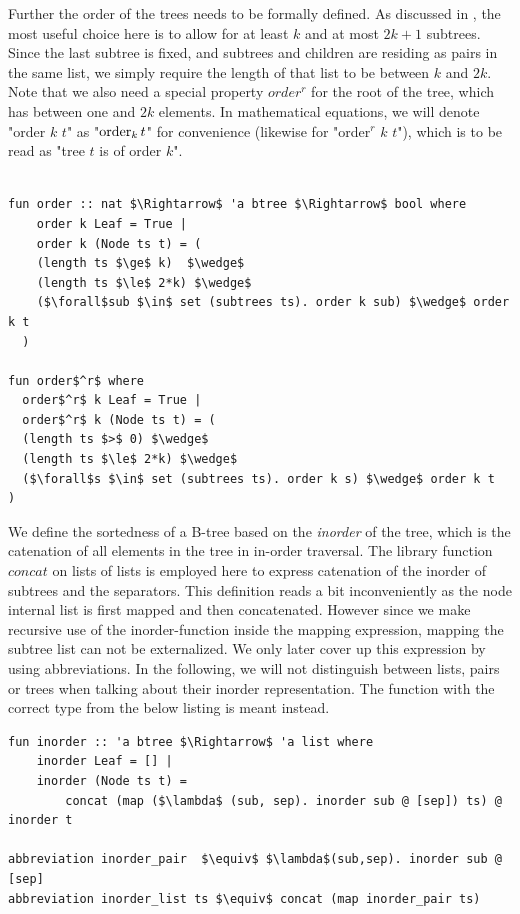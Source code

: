 Further the order of the trees needs to be formally defined.
As discussed in , the most useful choice here is
to allow for at least $k$ and at most $2k+1$ subtrees.
Since the last subtree is fixed, and subtrees and children are residing as pairs in the same list,
we simply require the length of that list to be between $k$ and $2k$.
Note that we also need a special property $order^r$ for the root of the tree,
which has between one and $2k$ elements.
In mathematical equations, we will denote "order $k$ $t$" as "$\operatorname{order}_k t$"
for convenience (likewise for "order$^r$ $k$ $t$"), which is to be read as
"tree $t$ is of order $k$".

\begin{lstlisting}[mathescape=true, language=Isabelle]

fun order :: nat $\Rightarrow$ 'a btree $\Rightarrow$ bool where
    order k Leaf = True |
    order k (Node ts t) = (
    (length ts $\ge$ k)  $\wedge$
    (length ts $\le$ 2*k) $\wedge$
    ($\forall$sub $\in$ set (subtrees ts). order k sub) $\wedge$ order k t
  )

fun order$^r$ where
  order$^r$ k Leaf = True |
  order$^r$ k (Node ts t) = (
  (length ts $>$ 0) $\wedge$
  (length ts $\le$ 2*k) $\wedge$
  ($\forall$s $\in$ set (subtrees ts). order k s) $\wedge$ order k t
)

\end{lstlisting}

We define the sortedness of a B-tree based on the \textit{inorder} of the tree,
which is the catenation of all elements in the tree in in-order traversal.
The library function $concat$ on lists of lists
is employed here to express catenation of
the inorder of subtrees and the separators.
This definition reads a bit inconveniently
as the node internal list is first mapped and then concatenated.
However since we make recursive use of the inorder-function
inside the mapping expression, mapping the subtree list can not be externalized.
We only later cover up this expression by using abbreviations.
In the following, we will not distinguish between lists, 
pairs or trees when talking about their inorder representation.
The function with the correct type from the below listing is meant instead.

\begin{lstlisting}[mathescape=true, language=Isabelle]
fun inorder :: 'a btree $\Rightarrow$ 'a list where
    inorder Leaf = [] |
    inorder (Node ts t) = 
        concat (map ($\lambda$ (sub, sep). inorder sub @ [sep]) ts) @ inorder t

abbreviation inorder_pair  $\equiv$ $\lambda$(sub,sep). inorder sub @ [sep]
abbreviation inorder_list ts $\equiv$ concat (map inorder_pair ts)
\end{lstlisting}

